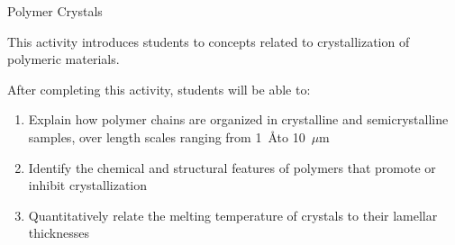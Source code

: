 %
%
%
%

\renewcommand{\figpath}{content/polymphys/thermal-transitions/crystals/figs}
\renewcommand{\labelbase}{crystals}

\begin{activity}{Polymer Crystals}

\begin{instructornotes}
	This activity introduces students to concepts related to crystallization of polymeric materials.
	
	After completing this activity, students will be able to:
	\begin{enumerate}
		\item Explain how polymer chains are organized in crystalline and semicrystalline samples, over length scales ranging from 1~\AA to 10~$\mu$m
		\item Identify the chemical and structural features of polymers that promote or inhibit crystallization
		\item Quantitatively relate the melting temperature of crystals to their lamellar thicknesses
	\end{enumerate}
	

\end{instructornotes}
\end{activity}
